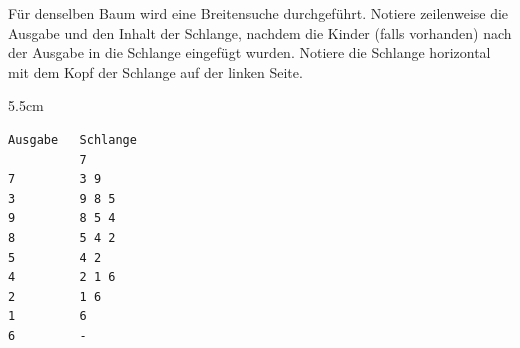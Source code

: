 \question[4]
Für denselben Baum wird eine Breitensuche durchgeführt. Notiere zeilenweise die Ausgabe und den Inhalt der Schlange, nachdem die Kinder (falls vorhanden) nach
der Ausgabe in die Schlange eingefügt wurden. Notiere die Schlange horizontal mit dem Kopf der Schlange auf der linken Seite.
\begin{solutionbox}{5.5cm}
\begin{lstlisting}[language={}]
Ausgabe   Schlange
          7
7         3 9
3         9 8 5
9         8 5 4
8         5 4 2
5         4 2
4         2 1 6
2         1 6
1         6
6         -
\end{lstlisting}
\end{solutionbox}
